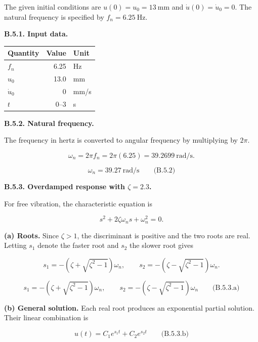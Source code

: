 \begingroup
\setlength{\abovedisplayskip}{6pt}
\setlength{\belowdisplayskip}{6pt}
\setlength{\abovedisplayshortskip}{4pt}
\setlength{\belowdisplayshortskip}{4pt}
\setlength{\intextsep}{6pt}

The given initial conditions are $u(0)=u_0=13\ \mathrm{mm}$ and $\dot{u}(0)=\dot{u}_0=0$. The natural frequency is specified by $f_n=6.25\ \mathrm{Hz}$.

\textbf{B.5.1. Input data.}

{ %
\begin{center}\small\begin{tabular}{@{}lrl@{}}
\toprule\noalign{}
Quantity & Value & Unit \\
\midrule\noalign{}
$f_n$ & 6.25 & Hz \\
$u_0$ & 13.0 & mm \\
$\dot{u}_0$ & 0 & mm/s \\
$t$ & $0$--$3$ & s \\
\bottomrule\end{tabular}\end{center}
}

\textbf{B.5.2. Natural frequency.}

The frequency in hertz is converted to angular frequency by multiplying by $2\pi$.

\[
\omega_n=2\pi f_n=2\pi(6.25)=39.2699\ \mathrm{rad/s}.
\]

\[
\boxed{\omega_n=39.27\ \mathrm{rad/s}}
\qquad\text{(B.5.2)}
\]

\textbf{B.5.3. Overdamped response with $\zeta=2.3$.}

For free vibration, the characteristic equation is

\[
s^2+2\zeta\omega_n s+\omega_n^2=0.
\]

\textbf{(a) Roots.} Since $\zeta>1$, the discriminant is positive and the two roots are real. Letting $s_1$ denote the faster root and $s_2$ the slower root gives

\[
s_1=-\left(\zeta+\sqrt{\zeta^2-1}\right)\omega_n,
\qquad
s_2=-\left(\zeta-\sqrt{\zeta^2-1}\right)\omega_n.
\]

\[
\boxed{
s_1=-\left(\zeta+\sqrt{\zeta^2-1}\right)\omega_n,
\qquad
s_2=-\left(\zeta-\sqrt{\zeta^2-1}\right)\omega_n
}
\qquad\text{(B.5.3.a)}
\]

\textbf{(b) General solution.} Each real root produces an exponential partial solution. Their linear combination is

\[
\boxed{u(t)=C_1e^{s_1t}+C_2e^{s_2t}}
\qquad\text{(B.5.3.b)}
\]

